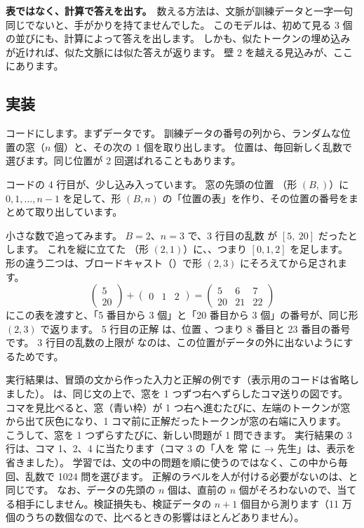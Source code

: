 \textbf{表ではなく、計算で答えを出す。}\
数える方法は、文脈が訓練データと一字一句同じでないと、手がかりを持てませんでした。
このモデルは、初めて見る 3 個の並びにも、計算によって答えを出します。
しかも、似たトークンの埋め込みが近ければ、似た文脈には似た答えが返ります。
壁 2 を越える見込みが、ここにあります。

\subsection*{実装}

コードにします。まずデータです。
訓練データの番号の列から、ランダムな位置の窓（$n$ 個）と、その次の 1 個を取り出します。
位置は、毎回新しく乱数で選びます。同じ位置が 2 回選ばれることもあります。


コードの 4 行目が、少し込み入っています。
窓の先頭の位置 （形 $(B,)$）に $0,1,\dots,n-1$ を足して、形 $(B,n)$ の「位置の表」を作り、その位置の番号をまとめて取り出しています。

小さな数で追ってみます。
$B=2$、$n=3$ で、3 行目の乱数  が $[5,\ 20]$ だったとします。
これを縦に立てた （形 $(2,1)$）に、、つまり $[0,1,2]$ を足します。
形の違う二つは、ブロードキャスト（\chapref{ch:pytorch}）で形 $(2,3)$ にそろえてから足されます。
\[
\begin{pmatrix}5\\20\end{pmatrix}+\begin{pmatrix}0&1&2\end{pmatrix}
=\begin{pmatrix}5&6&7\\20&21&22\end{pmatrix}
\]
 にこの表を渡すと、「5 番目から 3 個」と「20 番目から 3 個」の番号が、同じ形 $(2,3)$ で返ります。
5 行目の正解 \code{y} は、位置 \code{i + n}、つまり 8 番目と 23 番目の番号です。
3 行目の乱数の上限が  なのは、この位置がデータの外に出ないようにするためです。

実行結果は、冒頭の文から作った入力と正解の例です（表示用のコードは省略しました）。
は、同じ文の上で、窓を 1 つずつ右へずらしたコマ送りの図です。
コマを見比べると、窓（青い枠）が 1 つ右へ進むたびに、左端のトークンが窓から出て灰色になり、1 コマ前に正解だったトークンが窓の右端に入ります。
こうして、窓を 1 つずらすたびに、新しい問題が 1 問できます。
実行結果の 3 行は、コマ 1、2、4 に当たります（コマ 3 の「人を 常 に → 先生」は、表示を省きました）。
学習では、文の中の問題を順に使うのではなく、この中から毎回、乱数で 1024 問を選びます。
正解のラベルを人が付ける必要がないのは、と同じです。
なお、データの先頭の $n$ 個は、直前の $n$ 個がそろわないので、当てる相手にしません。検証損失も、検証データの $n+1$ 個目から測ります（11 万個のうちの数個なので、比べるときの影響はほとんどありません）。

